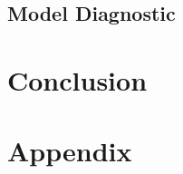 \documentclass[11pt, a4paper]{article} %
\begin{document}
\subsection{Model Diagnostic}




\section{Conclusion}


\newpage %
%



\newpage
{} %

\section*{Appendix}


\end{document}
